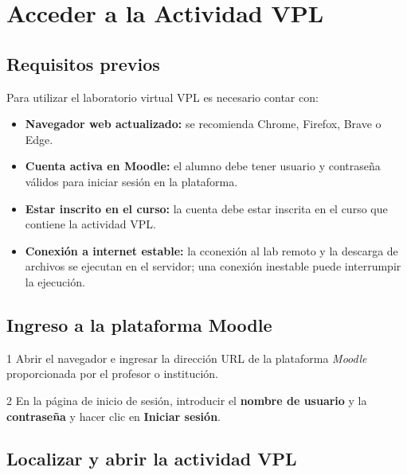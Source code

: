 \documentclass[12pt, a4paper, twoside, openany]{book}
\newcommand{\vpl}{\textsc{VPL}\xspace}
\newcommand{\moodle}{\textit{Moodle}\xspace}
\newcommand{\menu}[1]{\textsf{\textbf{#1}}}
\begin{document}
\chapter{Acceder a la Actividad VPL}
\label{ch:acceso}

\section{Requisitos previos}
\label{sec:requisitos}

Para utilizar el laboratorio virtual \vpl es necesario contar con:

\begin{itemize}
  \item \textbf{Navegador web actualizado:} se recomienda Chrome, Firefox,
        Brave o Edge. 
  \item \textbf{Cuenta activa en Moodle:} el alumno debe tener usuario y
        contraseña válidos para iniciar sesión en la plataforma.
  \item \textbf{Estar inscrito en el curso:} la cuenta debe estar inscrita en el
        curso que contiene la actividad \vpl.
  \item \textbf{Conexión a internet estable:} la cconexión al lab remoto y la descarga de archivos se
        ejecutan en el servidor; una conexión inestable puede interrumpir
        la ejecución.
\end{itemize}

\section{Ingreso a la plataforma Moodle}
\label{sec:ingreso-moodle}

\begin{stepbox}{1}
  Abrir el navegador e ingresar la dirección URL de la plataforma \moodle
  proporcionada por el profesor o institución.
\end{stepbox}

\begin{stepbox}{2}
  En la página de inicio de sesión, introducir el \textbf{nombre de usuario}
  y la \textbf{contraseña} y hacer clic en \menu{Iniciar sesión}.
\end{stepbox}


\section{Localizar y abrir la actividad VPL}
\label{sec:abrir-vpl}
\end{document}
